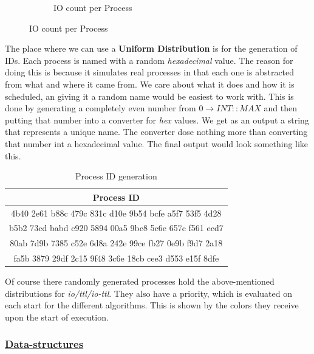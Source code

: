 \documentclass{article}
\begin{document}
\begin{figure}[H]
\begin{subfigure}[b]{0.5\textwidth}
      \caption{IO count per Process}
    \end{subfigure}
\end{figure}

The place where we can use a \textbf{Uniform Distribution} is for the generation of IDs. Each process is named with a random \textit{hexadecimal} value. The reason for doing this is because it simulates real processes in that each one is abstracted from what and where it came from. We care about what it does and how it is scheduled, an giving it a random name would be easiest to work with. This is done by generating a completely even number from $0 \rightarrow INT::MAX$ and then putting that number into a converter for \textit{hex} values. We get as an output a string that represents a unique name. The converter dose nothing more than converting that number int a hexadecimal value. The final output would look something like this.

\begin{table}[H]
  \begin{center}
    \label{tab:Process ID generation}
    \begin{tabular}{|c|}
      \toprule
       \textbf{Process ID} \\
      \midrule
      4b40 2e61 b88c 479c 831c d10e 9b54 bcfe a5f7 53f5 4d28 \\
      b5b2 73cd babd c920 5894 00a5 9bc8 5c6e 657c f561 ecd7 \\
      80ab 7d9b 7385 c52e 6d8a 242e 99ce fb27 0e9b f9d7 2a18 \\
      fa5b 3879 29df 2c15 9f48 3c6e 18cb cee3 d553 e15f 8dfe \\
      \bottomrule
    \end{tabular}
    \caption{Process ID generation}
  \end{center}
\end{table}

Of course there randomly generated processes hold the above-mentioned distributions for \textit{io/ttl/io-ttl}. They also have a priority, which is evaluated on each start for the different algorithms. This is shown by the colors they receive upon the start of execution.

\subsubsection{\underline{Data-structures}}
\end{document}
